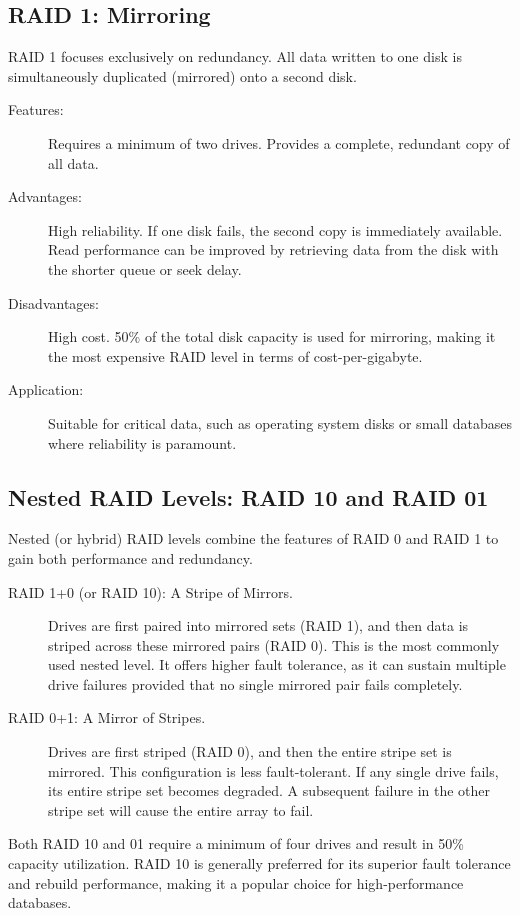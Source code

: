 \subsection{RAID 1: Mirroring}
RAID 1 focuses exclusively on redundancy. All data written to one disk is simultaneously duplicated (mirrored) onto a second disk.
\begin{description}
    \item[Features:] Requires a minimum of two drives. Provides a complete, redundant copy of all data.
    \item[Advantages:] High reliability. If one disk fails, the second copy is immediately available. Read performance can be improved by retrieving data from the disk with the shorter queue or seek delay.
    \item[Disadvantages:] High cost. 50\% of the total disk capacity is used for mirroring, making it the most expensive RAID level in terms of cost-per-gigabyte.
    \item[Application:] Suitable for critical data, such as operating system disks or small databases where reliability is paramount.
\end{description}

\subsection{Nested RAID Levels: RAID 10 and RAID 01}
Nested (or hybrid) RAID levels combine the features of RAID 0 and RAID 1 to gain both performance and redundancy.
\begin{description}
    \item[RAID 1+0 (or RAID 10): A Stripe of Mirrors.] Drives are first paired into mirrored sets (RAID 1), and then data is striped across these mirrored pairs (RAID 0). This is the most commonly used nested level. It offers higher fault tolerance, as it can sustain multiple drive failures provided that no single mirrored pair fails completely.
    \item[RAID 0+1: A Mirror of Stripes.] Drives are first striped (RAID 0), and then the entire stripe set is mirrored. This configuration is less fault-tolerant. If any single drive fails, its entire stripe set becomes degraded. A subsequent failure in the other stripe set will cause the entire array to fail.
\end{description}
Both RAID 10 and 01 require a minimum of four drives and result in 50\% capacity utilization. RAID 10 is generally preferred for its superior fault tolerance and rebuild performance, making it a popular choice for high-performance databases.

